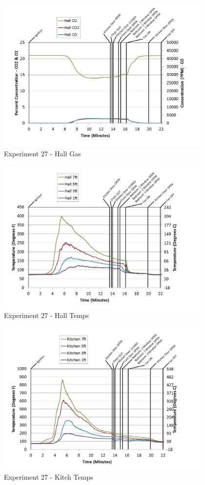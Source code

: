 \documentclass{article}
\begin{document}
\begin{appendices}
\begin{figure}[h!]
	\centering
	\includegraphics[height=3.05in]{0_Images/Results_Charts/Exp_27_Charts/HallGas.png}
	\caption{Experiment 27 - Hall Gas}
\end{figure}

\clearpage

\begin{figure}[h!]
	\centering
	\includegraphics[height=3.05in]{0_Images/Results_Charts/Exp_27_Charts/HallTemps.png}
	\caption{Experiment 27 - Hall Temps}
\end{figure}


\begin{figure}[h!]
	\centering
	\includegraphics[height=3.05in]{0_Images/Results_Charts/Exp_27_Charts/KitchTemps.png}
	\caption{Experiment 27 - Kitch Temps}
\end{figure}


\end{appendices}
\end{document}
